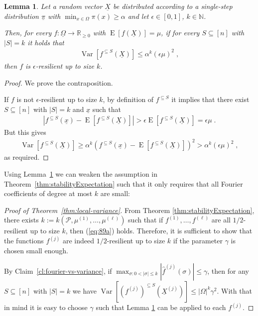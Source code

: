 \documentclass{daj}
\newcommand{\1}{\mathbbm{1}}
\theoremstyle{plain}
\newtheorem{lemma}[theorem]{Lemma}
\theoremstyle{definition}
\DeclareMathOperator*{\EE}{E}
\DeclareMathOperator*{\Var}{Var}
\newcommand{\cP}{\mathcal{P}}
\begin{document}
\begin{lemma}\label{lem:localInfluenceToStability}
Let a random vector $\underline{X}$ be distributed according to a single-step
distribution $\underline{\pi}$ with 
$\min_{x \in \Omega} \pi(x) \ge \alpha$ and
let $\epsilon \in [0, 1]$, $k \in \mathbb{N}$.

Then, for every $f: \underline{\Omega} \to \mathbb{R}_{\ge 0}$
with $\EE[f(\underline{X})] = \mu$, if for every
$S \subseteq[n]$ with $|S| = k$ it holds that
\begin{align*}
  \Var\left[f^{\subseteq S}(\underline{X})\right] \le \alpha^{k}(\epsilon\mu)^2 \; ,
\end{align*}
then $f$ is $\epsilon$-resilient up to size $k$.
\end{lemma}
\begin{proof}
We prove the contraposition. 

If $f$ is not $\epsilon$-resilient up to size $k$, by definition
of $f^{\subseteq S}$ it implies that there exist $S \subseteq [n]$ with
$|S| = k$ and $\underline{x}$ such that
\begin{align*}
  \left| f^{\subseteq S}(\underline{x}) -
  \EE[f^{\subseteq S}(\underline{X})] \right| >
  \epsilon \EE[f^{\subseteq S}(\underline{X})]
  = \epsilon\mu \; .
\end{align*}
But this gives
\begin{align*}
\Var\left[ f^{\subseteq S}(\underline{X}) \right] 
\ge \alpha^k 
\left(f^{\subseteq S}(\underline{x}) - \EE[f^{\subseteq S}(\underline{X})] 
\right)^2
> \alpha^{k} (\epsilon\mu)^2 \; ,
\end{align*}
as required.
\end{proof}

Using Lemma~\ref{lem:localInfluenceToStability} we can weaken
the assumption in Theorem~\ref{thm:stabilityExpectation}
such that it only requires that all Fourier coefficients of degree at most $k$
are small:

\begin{proof}[Proof of Theorem~\ref{thm:local-variance}]
From Theorem \ref{thm:stabilityExpectation}, there exists
$k := k(\cP, \mu^{(1)}, \ldots, \mu^{(\ell)})$ such that if
$f^{(1)}, \ldots, f^{(\ell)}$ are all $1/2$-resilient up to size $k$,
then (\ref{eq:89a}) holds. Therefore, it is sufficient to show that
the functions $f^{(j)}$ are indeed $1/2$-resilient up to size $k$
if the parameter $\gamma$ is chosen small enough.

By Claim~\ref{cl:fourier-vs-variance}, if $\max_{\sigma: 0<| \sigma|\le k} 
|\hat{f}^{(j)}(\sigma)| \le \gamma$, then for any
$S \subseteq [n]$ with $|S| = k$ we have
$\Var\left[ (f^{(j)})^{\subseteq S}(\underline{X}^{(j)})\right]
\le |\Omega|^k \gamma^2$. With that in mind it is easy to choose $\gamma$
such that Lemma 
\ref{lem:localInfluenceToStability} 
can be applied to each $f^{(j)}$.
\end{proof}
\end{document}
